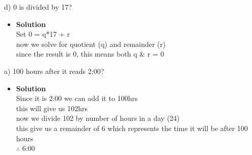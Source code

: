 \documentclass[11pt]{article}
\begin{document}
\begin{enumerate}

\begin{flushleft}
{\large d) 0 is divided by 17?}\\
\end{flushleft}





\begin{itemize}

\item \textbf{Solution}\\
\large Set 0 = q*17 + r\\
\large now we solve for quotient (q) and remainder (r)\\
\large since the result is 0, this means both q & r = 0\\



\end {itemize}
\end {enumerate}


\pagebreak



\begin{flushleft}
{\large \hspace{.5cm}\textbf{2. What time does a 24-hour clock read}\\
\end{flushleft}






\begin{enumerate}

\begin{flushleft}
{\large a) 100 hours after it reads 2:00?}\\
\end{flushleft}





\begin{itemize}

\item \textbf{Solution}\\
\large Since it is 2:00 we can add it to 100hrs\\
\large this will give us 102hrs\\
\large now we divide 102 by number of hours in a day (24)\\
\large this give us a remainder of 6 which represents the time it will be after 100 hours\\
\large $\therefore$ 6:00\\



\end {itemize}
\end {enumerate}
\end{document}
